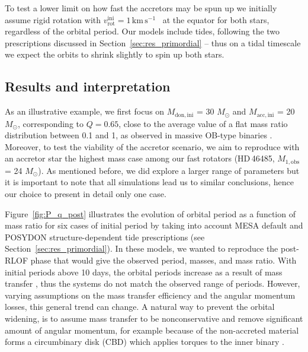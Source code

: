 \documentclass{aa}
\newcommand{\kms}{$\mathrm{km\,s^{-1}}$}
\DeclareRobustCommand{\Figref}[1]{Figure~\ref{#1}}
\DeclareRobustCommand{\Secref}[1]{Section~\ref{#1}}
\begin{document}
To test a lower limit on how fast the accretors may be spun up we
  initially assume rigid rotation with $v_\mathrm{rot}^\mathrm{ini} = 1$\,\kms~ at the equator for both stars, regardless of the orbital period.
Our models include tides, following the two prescriptions
  discussed in \Secref{sec:res_primordial} -- thus on a tidal
  timescale we expect the orbits to shrink slightly to spin up both
  stars.



\subsection{Results and interpretation}


As an illustrative example, we first focus on $M_\mathrm{don,ini}$ = 30 $M_{\odot}$ and
$M_\mathrm{acc,ini}$ = 20 $M_{\odot}$, corresponding to $Q=0.65$, close
to the average value of a flat mass ratio distribution between 0.1 and
1, as observed in massive OB-type binaries \citep[see][]{Vanbeveren_1981,Sana_2013}. Moreover, to test the
  viability of the accretor scenario, we aim to reproduce with an
  accretor star the highest mass case among our fast rotators (HD\,46485, $M_\mathrm{1, obs}$ = 24 $M_{\odot}$).
As mentioned before, we did explore a larger range of parameters but it is important to note that all simulations lead us to similar conclusions, hence our choice to present in detail only one case.


\Figref{fig:P_q_post} illustrates the evolution of orbital period as a
function of mass ratio for six cases of initial period by taking into
account MESA default and POSYDON structure-dependent tide
prescriptions (see \Secref{sec:res_primordial}). In these models,
we wanted to reproduce the post-RLOF phase that would give the
observed period, masses, and mass ratio. With initial periods
above 10 days,
the orbital periods increase as a result of mass transfer
\citep[e.g.,][]{Renzo_2019runaways}, thus the systems do not match the
observed range of periods.
However, varying assumptions on the
  mass transfer efficiency and the angular momentum losses, this
  general trend can change.
 A natural way to prevent the orbital widening, is to assume mass transfer to be nonconservative and remove significant amount of angular momentum, for
example because of the non-accreted material forms a circumbinary disk
(CBD) which applies torques to the inner binary \citep[see e.g.,][]{Vanbeveren_1982,Shao_2016}.
\end{document}
